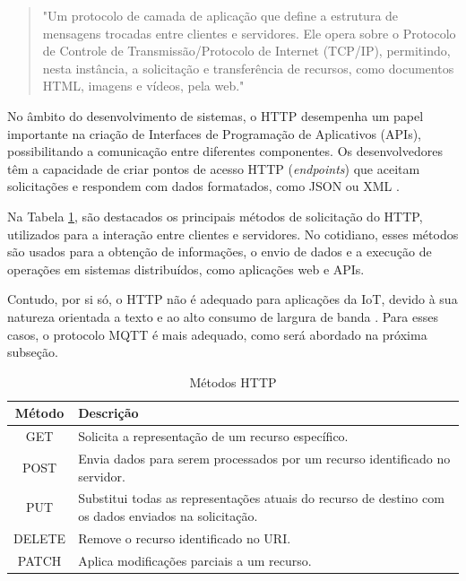 \begin{quote}
"Um protocolo de camada de aplicação que define a estrutura de mensagens trocadas entre clientes e servidores. Ele opera sobre o Protocolo de Controle de Transmissão/Protocolo de Internet (TCP/IP), permitindo, nesta instância, a solicitação e transferência de recursos, como documentos HTML, imagens e vídeos, pela web." \parencite{RFC2616}
\end{quote}

No âmbito do desenvolvimento de sistemas, o HTTP desempenha um papel importante na criação de Interfaces de Programação de Aplicativos (APIs), possibilitando a comunicação entre diferentes componentes. Os desenvolvedores têm a capacidade de criar pontos de acesso HTTP (\textit{endpoints}) que aceitam solicitações e respondem com dados formatados, como JSON ou XML \parencite{Newmann_web}.

Na Tabela \ref{tab:metodos_http}, são destacados os principais métodos de solicitação do HTTP, utilizados para a interação entre clientes e servidores. No cotidiano, esses métodos são usados para a obtenção de informações, o envio de dados e a execução de operações em sistemas distribuídos, como aplicações web e APIs.

Contudo, por si só, o HTTP não é adequado para aplicações da IoT, devido à sua natureza orientada a texto e ao alto consumo de largura de banda \parencite{Yassein_mqtt2017}. Para esses casos, o protocolo MQTT é mais adequado, como será abordado na próxima subseção.

\begin{table}[!htb]
  \caption{Métodos HTTP} \label{tab:metodos_http}
  \begin{tabularx}{\textwidth}{|c|X|} \hline
    \textbf{Método} & \textbf{Descrição} \\ \hline
    GET & Solicita a representação de um recurso específico. \\ \hline
    POST & Envia dados para serem processados por um recurso identificado no servidor. \\ \hline
    PUT & Substitui todas as representações atuais do recurso de destino com os dados enviados na solicitação. \\ \hline
    DELETE & Remove o recurso identificado no URI. \\ \hline
    PATCH & Aplica modificações parciais a um recurso. \\ \hline  
  \end{tabularx}
\end{table}

